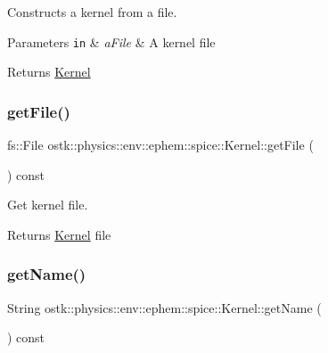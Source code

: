 Constructs a kernel from a file. 


\begin{DoxyParams}[1]{Parameters}
\mbox{\tt in}  & {\em a\+File} & A kernel file \\
\hline
\end{DoxyParams}
\begin{DoxyReturn}{Returns}
\hyperlink{classostk_1_1physics_1_1env_1_1ephem_1_1spice_1_1_kernel}{Kernel} 
\end{DoxyReturn}
\mbox{\label{classostk_1_1physics_1_1env_1_1ephem_1_1spice_1_1_kernel_a8f923e5079064c8e1d79e9fe275f4b0c}} 
\subsubsection{\texorpdfstring{get\+File()}{getFile()}}
{\footnotesize\ttfamily fs\+::\+File ostk\+::physics\+::env\+::ephem\+::spice\+::\+Kernel\+::get\+File (\begin{DoxyParamCaption}{ }\end{DoxyParamCaption}) const}



Get kernel file. 

\begin{DoxyReturn}{Returns}
\hyperlink{classostk_1_1physics_1_1env_1_1ephem_1_1spice_1_1_kernel}{Kernel} file 
\end{DoxyReturn}
\mbox{\label{classostk_1_1physics_1_1env_1_1ephem_1_1spice_1_1_kernel_ab5029446586728c69fab3c3c6e53f5f9}} 
\subsubsection{\texorpdfstring{get\+Name()}{getName()}}
{\footnotesize\ttfamily String ostk\+::physics\+::env\+::ephem\+::spice\+::\+Kernel\+::get\+Name (\begin{DoxyParamCaption}{ }\end{DoxyParamCaption}) const}



